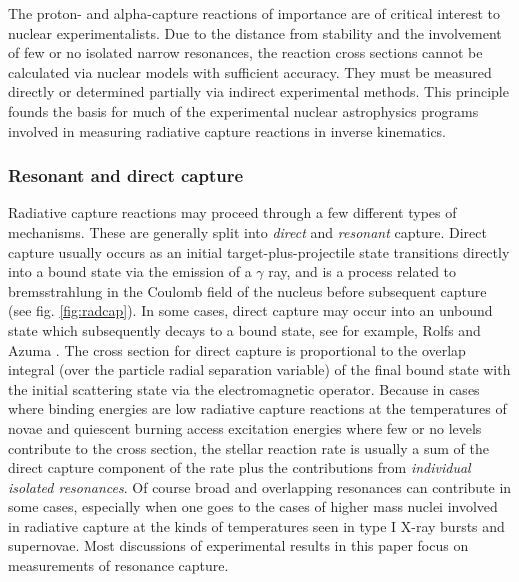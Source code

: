 The proton- and alpha-capture reactions of importance are of critical interest to nuclear experimentalists. Due to the distance from stability and the involvement of few or no isolated narrow resonances, the reaction cross sections cannot be calculated via nuclear models with sufficient accuracy. They must be measured directly or determined partially via indirect experimental methods. This principle founds the basis for much of the experimental nuclear astrophysics programs involved in measuring radiative capture reactions in inverse kinematics.   

\subsubsection{Resonant and direct capture}

Radiative capture reactions may proceed through a few different types of mechanisms. These are generally split into {\em direct} and {\em resonant} capture. Direct capture usually occurs as an initial target-plus-projectile state transitions directly into a bound state via the emission of a $\gamma$ ray, and is a process related to bremsstrahlung in the Coulomb field of the nucleus before subsequent capture (see fig. \ref{fig:radcap}). In some cases, direct capture may occur into an unbound state which subsequently decays to a bound state, see for example, Rolfs and Azuma \cite{rolfs74}. The cross section for direct capture is proportional to the overlap integral (over the particle radial separation variable) of the final bound state with the initial scattering state via the electromagnetic operator. Because in cases where binding energies are low radiative capture reactions at the temperatures of novae and quiescent burning access excitation energies where few or no levels contribute to the cross section, the stellar reaction rate is usually a sum of the direct capture component of the rate plus the contributions from  {\em individual isolated resonances}. Of course broad and overlapping resonances can contribute in some cases, especially when one goes to the cases of higher mass nuclei involved in radiative capture at the kinds of temperatures seen in type I X-ray bursts and supernovae. Most discussions of experimental results in this paper focus on measurements of resonance capture. 

